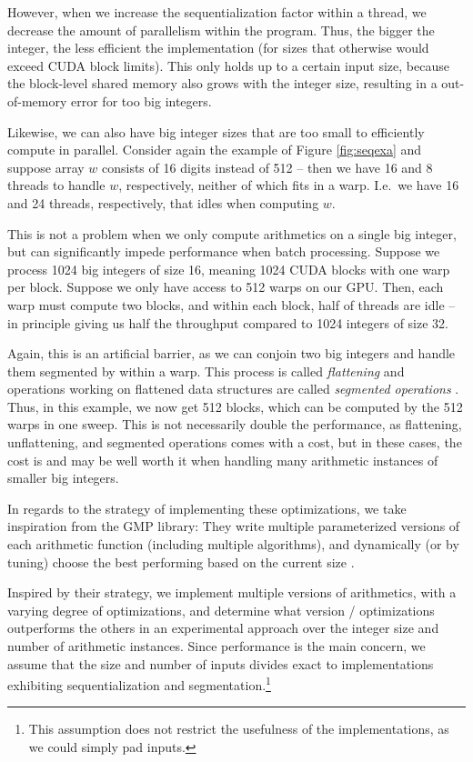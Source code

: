 However, when we increase the sequentialization factor within a thread, we
decrease the amount of parallelism within the program. Thus, the bigger the
integer, the less efficient the implementation (for sizes that otherwise would
exceed CUDA block limits). This only holds up to a certain input size, because
the block-level shared memory also grows with the integer size, resulting in a
out-of-memory error for too big integers.

Likewise, we can also have big integer sizes that are too small to efficiently
compute in parallel. Consider again the example of Figure \ref{fig:seqexa} and
suppose array $w$ consists of 16 digits instead of 512 -- then we have 16 and 8
threads to handle $w$, respectively, neither of which fits in a warp. I.e.\ we
have 16 and 24 threads, respectively, that idles when computing $w$.

This is not a problem when we only compute arithmetics on a single big integer,
but can significantly impede performance when batch processing. Suppose we
process 1024 big integers of size 16, meaning 1024 CUDA blocks with one warp per
block. Suppose we only have access to 512 warps on our GPU. Then, each warp must
compute two blocks, and within each block, half of threads are idle -- in
principle giving us half the throughput compared to 1024 integers of size 32.

Again, this is an artificial barrier, as we can conjoin two big integers and
handle them segmented by within a warp. This process is called
\textit{flattening} and operations working on flattened data structures are
called \textit{segmented operations} . Thus, in this example, we now get 512
blocks, which can be computed by the 512 warps in one sweep. This is not
necessarily double the performance, as flattening, unflattening, and segmented
operations comes with a cost, but in these cases, the cost is and may be well
worth it when handling many arithmetic instances of smaller big integers.


In regards to the strategy of implementing these optimizations, we take
inspiration from the GMP library: They write multiple parameterized versions of
each arithmetic function (including multiple algorithms), and dynamically (or by
tuning) choose the best performing based on the current size \cite{GMP}.

Inspired by their strategy, we implement multiple versions of arithmetics, with
a varying degree of optimizations, and determine what version / optimizations
outperforms the others in an experimental approach over the integer size and
number of arithmetic instances. Since performance is the main concern, we assume
that the size and number of inputs divides exact to implementations exhibiting
sequentialization and segmentation.\footnote{This assumption does not restrict
  the usefulness of the implementations, as we could simply pad inputs.}



